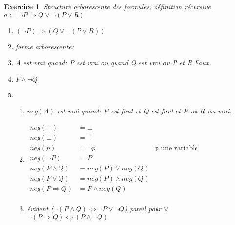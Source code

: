 \documentclass{article}
\theoremstyle{plain}
\newtheorem{exo}{Exercice}%
\begin{document}
\begin{exo} Structure arborescente des formules, définition récursive. \\
    $a := \neg P \Rightarrow Q \vee \neg(P \vee R)$
\begin{enumerate}
    \item $(\neg P) \Rightarrow (Q \vee \neg(P \vee R))$
    \item forme arborescente: \\
    
    \item A est vrai quand: P est vrai ou quand Q est vrai ou P et R Faux.
    \item $P \wedge \neg Q$
    \item \begin{enumerate}
        \item $neg(A)$ est vrai quand: P est faut et Q est faut et P ou R est vrai.
        \item \begin{align*}
            neg(\top) &= \bot \\
            neg(\bot) &= \top \\
            neg(p) &= \neg p & \text{p une variable propositionnelle} \\
            neg(\neg P) &= P \\
            neg(P \wedge Q) &= neg(P) \vee neg(Q)\\
            neg(P \vee Q) &= neg(P) \wedge neg(Q)\\
            neg(P \Rightarrow Q) &= P \wedge neg(Q)\\
        \end{align*}
        \item évident ($\neg (P \wedge Q) \Leftrightarrow \neg P \vee \neg Q$) pareil pour $\vee$ \\
            $\neg(P \Rightarrow Q) \Leftrightarrow (P \wedge \neg Q)$
    \end{enumerate}
\end{enumerate}
\end{exo}
\end{document}
